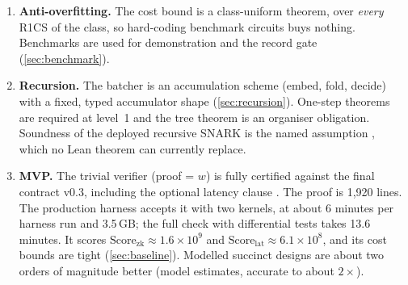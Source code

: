 \begin{takeaway}
\begin{enumerate}[nosep,leftmargin=*]
  (\cref{sec:cost}).
\item \textbf{Anti-overfitting.} The cost bound is a class-uniform theorem, over \emph{every} R1CS
  of the class, so hard-coding benchmark circuits buys nothing. Benchmarks are used for
  demonstration and the record gate (\cref{sec:benchmark}).
\item \textbf{Recursion.} The batcher is an accumulation scheme (embed, fold, decide) with a fixed,
  typed accumulator shape (\cref{sec:recursion}). One-step theorems are required at level~1 and
  the tree theorem is an organiser obligation. Soundness of the deployed recursive SNARK is the named
  assumption , which no Lean theorem can currently replace.
\item \textbf{MVP.} The trivial verifier (proof = $w$) is fully certified against the final
  contract v0.3, including the optional latency clause . The proof is 1{,}920 lines.
  The production harness accepts it with two kernels, at about 6 minutes per harness run and
  3.5\,GB; the full check with differential tests takes 13.6 minutes. It scores
  $\mathrm{Score}_{\mathrm{zk}}\approx1.6\times10^9$ and $\mathrm{Score}_{\mathrm{lat}}\approx6.1\times10^8$,
  and its cost bounds are tight (\cref{sec:baseline}). Modelled succinct designs are about two
  orders of magnitude better (model estimates, accurate to about $2\times$).
\end{enumerate}
\end{takeaway}

